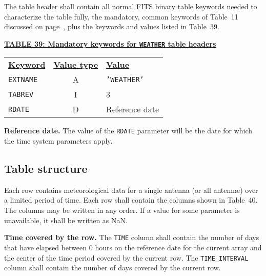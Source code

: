 \documentclass[twoside]{article}
\newcommand{\Hi}[1]{\textcolor{hicol}{#1}}
\begin{document}
The table header shall contain all normal FITS binary table keywords
needed to characterize the table fully, the mandatory, common keywords
of Table~11 discussed on page~\pageref{ta:keywords}, plus the keywords
and values listed in Table~39.

\begin{center}
\underline{\bf{TABLE 39: Mandatory keywords for {\tt WEATHER} table
    headers}}\\
\begin{tabular}{lcl}
\noalign{\vspace{2pt}}
\underline{{\bf Keyword}} & \underline{\bf{Value type}} &
    \underline{\bf{Value\vphantom{y}}} \\
\noalign{\vspace{2pt}}
{\tt EXTNAME}   & A & {\tt 'WEATHER'}  \\
{\tt TABREV}    & I & \Hi{3} \\
{\tt RDATE}     & D & Reference date \\
\end{tabular}
\end{center}

{\bf Reference date.} The value of the {\tt RDATE} parameter will be
the date for which the time system parameters apply.

\subsection{Table structure}

Each row contains meteorological data for a single antenna (or all
antenn\ae) over a limited period of time.  Each row shall contain the
columns shown in Table~40.  The columns may be written in any order.
If a value for some parameter is unavailable, it shall be written as
NaN.

{\bf Time covered by the row.}  The {\tt TIME} column shall contain
the number of days that have elapsed between 0 hours on the reference
date for the current array and the center of the time period covered
by the current row.  The {\tt TIME\_INTERVAL} column shall contain the
number of days covered by the current row.
\end{document}
